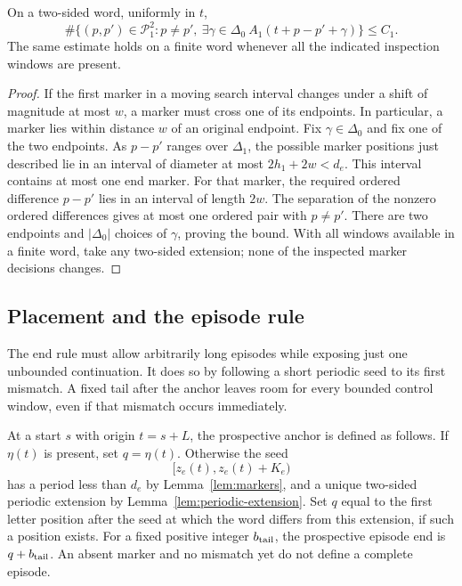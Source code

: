 \begin{lemma}
\label{lem:end-ambiguity}
On a two-sided word, uniformly in $t$,
\begin{equation}
 \label{eq:end-ambiguity}
 \#\bigl\{(p,p')\in\mathcal P_1^2:p\ne p',\
       \exists\gamma\in\Delta_0\ A_1(t+p-p'+\gamma)\bigr\}
 \le C_1.
\end{equation}
The same estimate holds on a finite word whenever all the indicated
inspection windows are present.
\end{lemma}

\begin{proof}
If the first marker in a moving search interval changes under a shift of
magnitude at most $w$, a marker must cross one of its endpoints.  In
particular, a marker lies within distance $w$ of an original endpoint.
Fix $\gamma\in\Delta_0$ and fix one of the two endpoints.  As $p-p'$
ranges over $\Delta_1$, the possible marker positions just described lie
in an interval of diameter at most $2h_1+2w<d_e$.  This interval contains
at most one end marker.  For that marker, the required ordered difference
$p-p'$ lies in an interval of length $2w$.  The separation of the nonzero
ordered differences gives at most one ordered pair with $p\ne p'$.
There are two endpoints and $|\Delta_0|$ choices of $\gamma$, proving
the bound.  With all windows available in a finite word, take any
two-sided extension; none of the inspected marker decisions changes.
\end{proof}

\subsection{Placement and the episode rule}

The end rule must allow arbitrarily long episodes while exposing just one
unbounded continuation. It does so by following a short periodic seed to
its first mismatch. A fixed tail after the anchor leaves room for every
bounded control window, even if that mismatch occurs immediately.

At a start $s$ with origin $t=s+L$, the prospective anchor is defined as
follows.  If $\eta(t)$ is present, set $q=\eta(t)$.  Otherwise the seed
\[
 [z_e(t),z_e(t)+K_e)
\]
has a period less than $d_e$ by Lemma~\ref{lem:markers}, and a unique
two-sided periodic extension by Lemma~\ref{lem:periodic-extension}.
Set $q$ equal to the first letter position after the seed at which the word
differs from this extension, if such a position exists.  For a fixed
positive integer $b_{\rm tail}$, the prospective episode end is
$q+b_{\rm tail}$.  An absent marker and no mismatch yet do not define a
complete episode.

